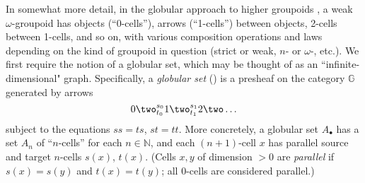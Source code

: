 \documentclass[reqno,12pt]{amsart}
\newcommand{\A}{A_\bullet}
\newcommand{\G}{\mathbb{G}}
\newcommand{\N}{\mathbb{N}}
\theoremstyle{definition}
\theoremstyle{remark}
\begin{document}
In somewhat more detail,  in the globular approach to higher groupoids \cite{Leinster:HOHC,Batanin:MGCNETWNC}, a weak $\omega$-groupoid has objects (``0-cells''), arrows (``1-cells'') between objects, 2-cells between 1-cells, and so on, with various composition operations and laws depending on the kind of groupoid in question (strict or weak, $n$- or $\omega$-, etc.).  
We first require the notion of a globular set, which may be thought of as an ``infinite-dimensional" graph.  Specifically, a \emph{globular set} (\cite{Batanin:MGCNETWNC,Street:PTGS}) is a presheaf on the category $\G$ generated by arrows
$$ 0 \two^{s_0}_{t_0} 1 \two^{s_1}_{t_1} 2 \two \ldots $$
subject to the equations $ss = ts$, $st = tt$.  
More concretely, a globular set $\A$ has a set $A_n$ of ``$n$-cells'' for each $n \in \N$, and each $(n+1)$-cell $x$ has parallel source and target $n$-cells $s(x)$, $t(x)$.  (Cells $x,y$ of dimension $>0$ are \emph{parallel} if $s(x) = s(y)$ and $t(x) = t(y)$; all $0$-cells are considered parallel.)  
\end{document}
